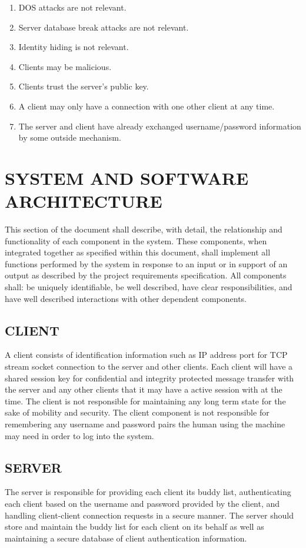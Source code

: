 \documentclass[twoside,letterpaper]{article}
\begin{document}
\begin{enumerate}
\item DOS attacks are not relevant.
\item Server database break attacks are not relevant.
\item Identity hiding is not relevant.
\item Clients may be malicious.
\item Clients trust the server's public key.
\item A client may only have a connection with one other client at any time.
\item The server and client have already exchanged username/password information by some outside 
mechanism.
\end{enumerate}

\bigskip

\section{SYSTEM AND SOFTWARE
ARCHITECTURE}
This section of the document shall describe, with detail, the relationship
and functionality of each component in the system. These components, when
integrated together as specified within this document, shall implement
all functions performed by the system in response to an input or in
support of an output as described by the project requirements specification.
All components shall: be uniquely identifiable, be well described,
have clear responsibilities, and have well described interactions with other dependent components.

\bigskip

\subsection{CLIENT}
A client consists of identification information such as IP address port
for TCP stream socket connection to the server and other clients. 
Each client will have a shared session key for confidential and 
integrity protected message transfer with the server and any other clients that it may have a
active session with at the time. The client is not responsible for maintaining any long term state
for the sake of mobility and security. The client component is not responsible for remembering
any username and password pairs the human using the machine may need in order to log into the
system.

\bigskip

\subsection{SERVER}
The server is responsible for providing each client its buddy list, authenticating each client based on the
username and password provided by the client, and handling client-client connection requests in a secure manner. The server should store and maintain the buddy list for each client on its behalf as well as maintaining a
secure database of client authentication information.
\end{document}
